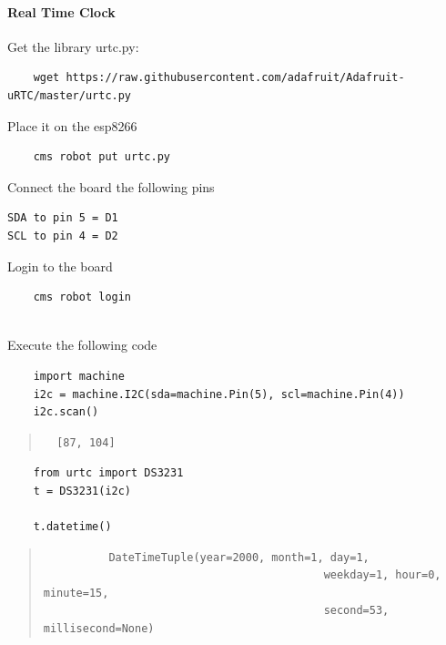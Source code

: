 \paragraph{Real Time Clock}\label{real-time-clock}

Get the library urtc.py:

\begin{verbatim}
    wget https://raw.githubusercontent.com/adafruit/Adafruit-uRTC/master/urtc.py
\end{verbatim}

Place it on the esp8266

\begin{verbatim}
    cms robot put urtc.py
\end{verbatim}

Connect the board the following pins

\begin{verbatim}
SDA to pin 5 = D1
SCL to pin 4 = D2
\end{verbatim}

Login to the board

\begin{verbatim}
    cms robot login
    
\end{verbatim}

Execute the following code

\begin{verbatim}
    import machine
    i2c = machine.I2C(sda=machine.Pin(5), scl=machine.Pin(4))
    i2c.scan()
\end{verbatim}

\begin{quote}
\begin{verbatim}
  [87, 104]
\end{verbatim}
\end{quote}

\begin{verbatim}
    from urtc import DS3231
    t = DS3231(i2c)

    t.datetime()
\end{verbatim}

\begin{quote}
\begin{verbatim}
          DateTimeTuple(year=2000, month=1, day=1, 
                                           weekday=1, hour=0, minute=15,
                                           second=53, millisecond=None)
\end{verbatim}
\end{quote}

